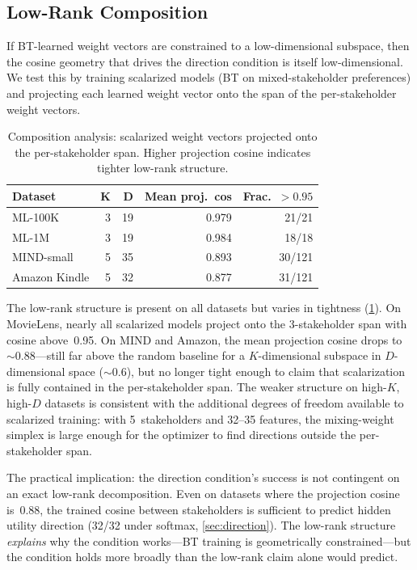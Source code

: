 \documentclass[11pt,letterpaper]{article}
\begin{document}
\subsection{Low-Rank Composition}

If BT-learned weight vectors are constrained to a low-dimensional
subspace, then the cosine geometry that drives the direction condition
is itself low-dimensional. We test this by training scalarized models
(BT on mixed-stakeholder preferences) and projecting each learned
weight vector onto the span of the per-stakeholder weight vectors.

\begin{table}[t]
  \caption{Composition analysis: scalarized weight vectors projected
    onto the per-stakeholder span. Higher projection cosine indicates
    tighter low-rank structure.}
  \label{tab:composition}
  \centering\small
  \begin{tabular}{lrrrr}
    \toprule
    \textbf{Dataset} & $\boldsymbol{K}$ & $\boldsymbol{D}$ &
      \textbf{Mean proj.\ cos} & \textbf{Frac.\ $> 0.95$} \\
    \midrule
    ML-100K       & 3 & 19 & 0.979 & 21/21 \\
    ML-1M         & 3 & 19 & 0.984 & 18/18 \\
    MIND-small    & 5 & 35 & 0.893 & 30/121 \\
    Amazon Kindle & 5 & 32 & 0.877 & 31/121 \\
    \bottomrule
  \end{tabular}
\end{table}

The low-rank structure is present on all datasets but varies in
tightness (\cref{tab:composition}). On MovieLens, nearly all
scalarized models project onto the 3-stakeholder span with cosine
above~0.95. On MIND and Amazon, the mean projection cosine drops to
${\sim}0.88$---still far above the random baseline for a
$K$-dimensional subspace in $D$-dimensional space (${\sim}0.6$), but
no longer tight enough to claim that scalarization is fully contained
in the per-stakeholder span. The weaker structure on high-$K$,
high-$D$ datasets is consistent with the additional degrees of freedom
available to scalarized training: with 5~stakeholders and 32--35
features, the mixing-weight simplex is large enough for the optimizer
to find directions outside the per-stakeholder span.

The practical implication: the direction condition's success is not
contingent on an exact low-rank decomposition. Even on datasets where
the projection cosine is~0.88, the trained cosine between stakeholders
is sufficient to predict hidden utility direction (32/32 under softmax,
\cref{sec:direction}). The low-rank structure \emph{explains} why the
condition works---BT training is geometrically constrained---but the
condition holds more broadly than the low-rank claim alone would
predict.
\end{document}
